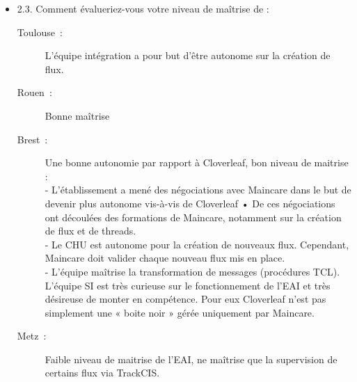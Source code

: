 \begin{itemize}
	   \item 2.3. Comment évalueriez-vous votre niveau de maîtrise de :
	   \begin{description}
	  	\item[Toulouse~:] L’équipe intégration a pour but d’être autonome sur la
	  	création de flux.
	  	\item[Rouen~:] Bonne maîtrise
	  	\item[Brest~:] Une bonne autonomie par rapport à Cloverleaf, bon niveau de
	  	maitrise :\\
		-	L’établissement a mené des négociations avec Maincare dans le but de
		devenir plus autonome vis-à-vis de Cloverleaf •	De ces négociations ont
		découlées des formations de Maincare, notamment sur la création de flux et de
		threads.\\
		-	Le CHU est autonome pour la création de nouveaux flux. Cependant, Maincare
		doit valider chaque nouveau flux mis en place.\\
		-	L’équipe maîtrise la transformation de messages (procédures TCL).\\
		L’équipe SI est très curieuse sur le fonctionnement de l’EAI et très
		désireuse de monter en compétence. Pour eux Cloverleaf n’est pas simplement
		une « boite noir » gérée uniquement par Maincare.
	  	\item[Metz~:] Faible niveau de maitrise de l’EAI, ne maîtrise que la
	  	supervision de certains flux via TrackCIS.
	  \end{description}
	  

\end{itemize}
